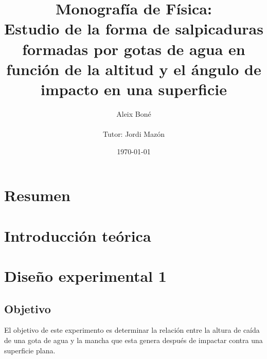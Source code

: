 
\title{ Monografía de Física: \\ Estudio de la forma de salpicaduras formadas
por gotas de agua en función de la altitud y el ángulo de impacto en una
superficie} \author{ Aleix Boné \\ \\ Tutor: Jordi Mazón } \date{\today}

\setcounter{page}{-1}



  \clearpage\maketitle \thispagestyle{empty}
\vspace{1cm}

    \pagebreak \thispagestyle{empty}  
    \tableofcontents \pagebreak \listoffigures \pagebreak \listoftables \pagebreak
    \section{Resumen} \label{sec:resumen}

\section{Introducción teórica} \label{sec:introduccion_teorica}

\section{Diseño experimental 1} \label{sec:Diseño experimental 1}
\subsection{Objetivo} \label{sub:objetivo} 
El objetivo de este experimento es
determinar la relación entre la altura de caída de una gota de agua y la mancha
que esta genera después de impactar contra una superficie plana.

